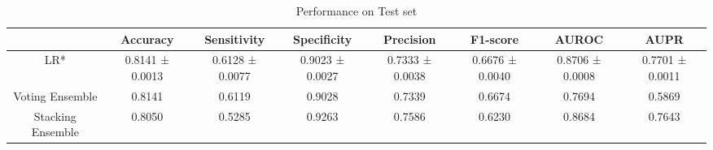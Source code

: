 \begin{table}[h!]
    \centering
    \caption{Performance on Test set}
    \begin{adjustbox}{width=\textwidth}
    \begin{tabular}{|c|c|c|c|c|c|c|c|}
    \hline
      & Accuracy & Sensitivity & Specificity & Precision & F1-score & AUROC & AUPR \\
    \hline
    LR* & 0.8141 ± 0.0013 & 0.6128 ± 0.0077 & 0.9023 ± 0.0027 & 0.7333 ± 0.0038 & 0.6676 ± 0.0040 & 0.8706 ± 0.0008 & 0.7701 ± 0.0011 \\
    \hline
    Voting Ensemble & 0.8141 & 0.6119 & 0.9028 & 0.7339 & 0.6674 & 0.7694 & 0.5869 \\
    \hline
    Stacking Ensemble & 0.8050 & 0.5285 & 0.9263 & 0.7586 & 0.6230 & 0.8684 & 0.7643 \\
    \hline
    \end{tabular}
    \end{adjustbox}
    \end{table}
    